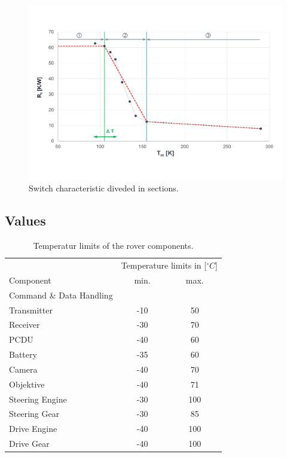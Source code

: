 \begin{figure}[H]
	\centering
	\includegraphics[width=1\textwidth]{Media/tcs_diag_section}
	\caption{Switch characteristic diveded in sections.}
	\label{fig:tcs_switch03}
\end{figure}

\subsection{Values}
\begin{table}[htb]
	\centering
	\begin{tabular}{lcc}
		\hline
		 & \multicolumn{2}{l}{Temperature limits in [$^\circ C$]} \\ 
		Component	&	min. & max. \\\hline
		Command \& Data Handling & & \\
		Transmitter & -10 & 50 \\
		Receiver & -30 & 70 \\
		PCDU & -40 & 60 \\
		Battery & -35 & 60 \\
		Camera & -40 & 70 \\
		Objektive  & -40 & 71 \\
		Steering Engine & -30 & 100 \\
		Steering Gear & -30 & 85 \\
		Drive Engine & -40 & 100 \\
		Drive Gear & -40 & 100 \\ \hline
	\end{tabular}
	\caption{Temperatur limits of the rover components.}
	\label{tab:tcs_limits}
\end{table}


